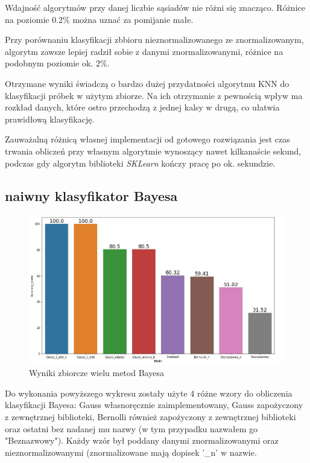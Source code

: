 \documentclass[12pt,a4paper]{article}
\begin{document}
        	
        	Wdajność algorytmów przy danej liczbie sąsiadów nie różni się znacząco. Różnice na poziomie $0.2\%$ można uznać za pomijanie małe.
        	
        	Przy porównaniu klasyfikacji zbbioru nieznormalizowanego ze znormalizowanym, algorytm zawsze lepiej radził sobie z danymi znormalizowanymi, różnice na podobnym poziomie ok. $2\%$.
        	
        	Otrzymane wyniki świadczą o bardzo dużej przydatności algorytmu KNN do klasyfikacji próbek w użytym zbiorze. Na ich otrzymanie z pewnością wpływ ma rozkład danych, które ostro przechodzą z jednej kalsy w drugą, co ułatwia prawidłową klasyfikację.
        	
        	Zauważalną różnicą własnej implementacji od gotowego rozwiązania jest czas trwania obliczeń przy własnym algorytmie wynoszący nawet kilkanaście sekund, podczas gdy algorytm biblioteki \textit{SKLearn} kończy pracę po ok. sekundzie.
	
	    \newpage
        \subsection{naiwny klasyfikator Bayesa}
       
        	\begin{figure}[h!]
        			\center	
        			\includegraphics[width=1.1\textwidth]{img/bayes_zbiorczy.JPG}
        			\caption{Wyniki zbiorcze wielu metod Bayesa}
        		\end{figure}
        		Do wykonania powyższego wykresu zostały użyte 4 różne wzory do obliczenia klasyfikacji Bayesa: Gauss własnoręcznie zaimplementowany, Gauss zapożyczony z zewnętrznej biblioteki, Bernolli również zapożyczony z zewnętrznej biblioteki oraz ostatni bez nadanej mu nazwy (w tym przypadku nazwałem go "Beznazwowy"). Każdy wzór był poddany danymi znormalizowanymi oraz nieznormalizowanymi (znormalizowane mają dopisek '\_n' w nazwie.
        		
\end{document}
